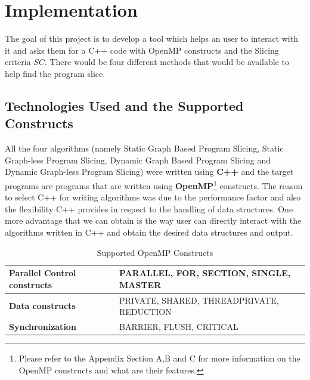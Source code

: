 \documentclass[conference]{IEEEtran}
\begin{document}
\section{Implementation}
\par The goal of this project is to develop a tool which helps an user to interact with it and asks them for a C++ code with OpenMP constructs and the Slicing criteria $SC$. There would be four different methods that would be available to help find the program slice.
\subsection{Technologies Used and the Supported Constructs}
\par All the four algorithms (namely Static Graph Based Program Slicing, Static Graph-less Program Slicing, Dynamic Graph Based Program Slicing and Dynamic Graph-less Program Slicing) were written using \textbf{C++} and the target programs are programs that are written using \textbf{OpenMP}\footnote{Please refer to the Appendix Section A,B and C for more information on the OpenMP constructs and what are their features.} constructs. The reason to select C++ for writing algorithms was due to the performance factor and also the flexibility C++ provides in respect to the handling of data structures. One more advantage that we can obtain is the way user can directly interact with the algorithms written in C++ and obtain the desired data structures and output.
\begin{table}[h!]
\begin{center}
\begin{tabular}{| p{} | p{} |}
\hline
    \textbf{Parallel Control constructs} & PARALLEL, FOR, SECTION, SINGLE, MASTER  \\
\hline
    \textbf{Data constructs} & PRIVATE, SHARED, THREADPRIVATE, REDUCTION  \\
\hline
    \textbf{Synchronization} & BARRIER, FLUSH, CRITICAL  \\
\hline
\end{tabular}
\end{center}
\caption{Supported OpenMP Constructs}
\label{tab:template}
\end{table}
\end{document}
